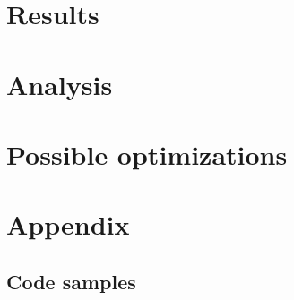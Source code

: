\documentclass{article}
\begin{document}
\section{Results}

\section{Analysis}

\section{Possible optimizations}

\section{Appendix}
\subsection{Code samples}
\end{document}
